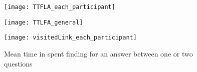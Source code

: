 %

\begin{figure}[!h]
\centering
\begin{minipage}{.5\textwidth}
  \centering
  \texttt{[image: TTFLA\_each\_participant]}
  \captionsetup{justification=centering}
  \label{fig:TTFA_oneTwoQues}
\end{minipage} \qquad
\begin{minipage}{.5\textwidth}
  \centering
  \texttt{[image: TTLFA\_general]}
  \captionsetup{justification=centering}
  \label{fig:TTLFA_oneTwoQuesGeneral}
\end{minipage}
\end{figure}


\begin{figure}[!h]
\begin{center}
\texttt{[image: visitedLink\_each\_participant]}
\end{center}
\captionsetup{justification=centering}
\caption{Mean time in spent finding for an answer between one or two questions}
\label{fig:lookingAnswer_oneOrTwo}
\end{figure}



